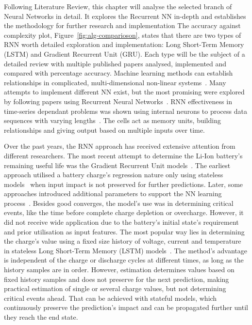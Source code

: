 Following Literature Review, this chapter will analyse the selected branch of Neural Networks in detail.
It explores the Recurrent NN in-depth and establishes the methodology for further research and implementation
The accuracy against complexity plot, Figure~\ref{fig:alg-comparioson}, states that there are two types of RNN worth detailed exploration and implementation: Long Short-Term Memory (LSTM) and Gradient Recurrent Unit (GRU).
Each type will be the subject of a detailed review with multiple published papers analysed, implemented and compared with percentage accuracy. 
%
%
Machine learning methods can establish relationships in complicated, multi-dimensional non-linear systems~\cite{hansen_support_2005,anton_battery_2013,he_state_2014}.
Many attempts to implement different NN exist, but the most promising were explored by following papers using Recurrent Neural Networks~\cite{song_lithium-ion_2018,Chemali2017,mamo_long_2020,jiao_gru-rnn_2020,xiao_accurate_2019,javid_adaptive_2020,zhang_deep_2020}.
RNN effectiveness in time-series dependant problems was shown using internal neurons to process data sequences with varying lengths~\cite{Chemali2017}.
The cells act as memory units, building relationships and giving output based on multiple inputs over time.

%
%
Over the past years, the RNN approach has received extensive attention from different researchers. The most recent attempt to determine the Li-Ion battery's remaining useful life was the Gradient Recurrent Unit models~\cite{song_lithium-ion_2018,javid_adaptive_2020,xiao_accurate_2019,jiao_gru-rnn_2020}.
The earliest approach utilised a battery charge's regression nature only using stateless models~\cite{song_lithium-ion_2018,jiao_gru-rnn_2020,xiao_accurate_2019} when input impact is not preserved for further predictions.
Later, some approaches introduced additional parameters to support the NN learning process~\cite{mamo_long_2020,jiao_gru-rnn_2020,javid_adaptive_2020}.
Besides good converges, the model's use was in determining critical events, like the time before complete charge depletion or overcharge.
However, it did not receive wide application due to the battery's initial state's requirement and prior utilisation as input features.
The most popular way lies in determining the charge's value using a fixed size history of voltage, current and temperature in stateless Long Short-Term Memory (LSTM) models~\cite{Chemali2017,mamo_long_2020,javid_adaptive_2020,zhang_deep_2020}.
The method's advantage is independent of the charge or discharge cycles at different times, as long as the history samples are in order.
However, estimation determines values based on fixed history samples and does not preserve for the next prediction, making practical estimation of single or several charge values, but not determining critical events ahead.
That can be achieved with stateful models, which continuously preserve the prediction's impact and can be propagated further until they reach the end state.

